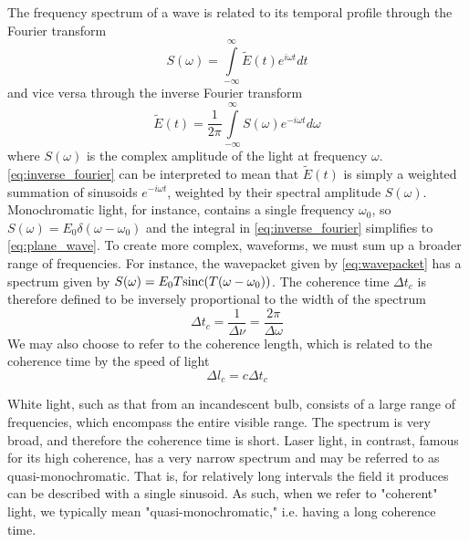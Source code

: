 The frequency spectrum of a wave is related to its temporal profile through the Fourier transform
\begin{equation} \label{eq:fourier}
S(\omega) = \int\limits_{-\infty}^{\infty} \tilde{E}(t) e^{i\omega t} dt
\end{equation}
and vice versa through the inverse Fourier transform
\begin{equation} \label{eq:inverse_fourier}
\tilde{E}(t) = \frac{1}{2\pi}\int\limits_{-\infty}^{\infty} S(\omega) e^{-i\omega t} d\omega
\end{equation}
where $S(\omega)$ is the complex amplitude of the light at frequency $\omega$. \autoref{eq:inverse_fourier} can be interpreted to mean that $\tilde{E}(t)$ is simply a weighted summation of sinusoids $e^{-i\omega t}$, weighted by their spectral amplitude $S(\omega)$. Monochromatic light, for instance, contains a single frequency $\omega_0$, so $S(\omega) = E_0\delta(\omega-\omega_0)$ and the integral in \autoref{eq:inverse_fourier} simplifies to \autoref{eq:plane_wave}. To create more complex, waveforms, we must sum up a broader range of frequencies. For instance, the wavepacket given by \autoref{eq:wavepacket} has a spectrum given by $S(\omega)=E_0 T \textnormal{sinc}(T(\omega-\omega_0))$. The coherence time $\Delta t_c$ is therefore defined to be inversely proportional to the width of the spectrum
\begin{equation}
\Delta t_c = \frac{1}{\Delta \nu} = \frac{2\pi}{\Delta \omega} 
\end{equation}
We may also choose to refer to the coherence length, which is related to the coherence time by the speed of light
\begin{equation}
\Delta l_c = c\Delta t_c
\end{equation}

White light, such as that from an incandescent bulb, consists of a large range of frequencies, which encompass the entire visible range. The spectrum is very broad, and therefore the coherence time is short. Laser light, in contrast, famous for its high coherence, has a very narrow spectrum and may be referred to as quasi-monochromatic. That is, for relatively long intervals the field it produces can be described with a single sinusoid. As such, when we refer to "coherent" light, we typically mean "quasi-monochromatic," i.e. having a long coherence time. 




